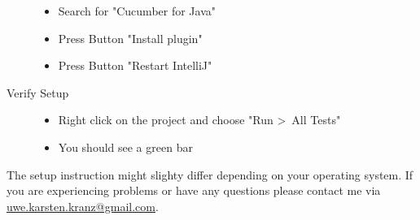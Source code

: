 \documentclass{article}
\begin{document}
\begin{description}
\begin{itemize}
	                \item Search for "Cucumber for Java"
	                \item Press Button "Install plugin"
	 		\item Press Button "Restart IntelliJ"
		\end{itemize}
                	\item[Verify Setup] \hfill
                \begin{itemize}
                        \item Right click on the project and choose "Run \textgreater\ All Tests"
                        \item You should see a green bar
                \end{itemize}

	\end{description}

The setup instruction might slighty differ depending on your operating system. If you are experiencing problems or have any questions please contact me via \href{mailto:uwe.karsten.kranz@gmail.com}{uwe.karsten.kranz@gmail.com}.
\end{document}
